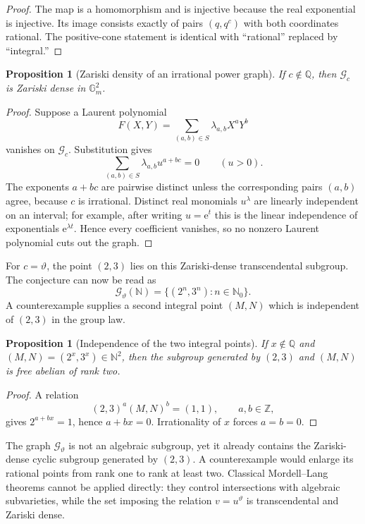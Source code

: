 \documentclass[11pt,oneside]{article}
\newtheorem{proposition}[theorem]{Proposition}
\theoremstyle{definition}
\newcommand{\Q}{\mathbb{Q}}
\newcommand{\Z}{\mathbb{Z}}
\newcommand{\N}{\mathbb{N}}
\newcommand{\Gm}{\mathbb{G}_{m}}
\newcommand{\ee}{\mathrm{e}}
\newcommand{\cG}{\mathscr{G}}
\begin{document}
\begin{proof}
The map is a homomorphism and is injective because the real exponential is injective.  Its image consists exactly of pairs $(q,q^c)$ with both coordinates rational.  The positive-cone statement is identical with ``rational'' replaced by ``integral.''
\end{proof}

\begin{proposition}[Zariski density of an irrational power graph]\label{prop:graphdense}
If $c\notin\Q$, then $\cG_c$ is Zariski dense in $\Gm^2$.
\end{proposition}

\begin{proof}
Suppose a Laurent polynomial
\[
       F(X,Y)=\sum_{(a,b)\in S}\lambda_{a,b}X^aY^b
\]
vanishes on $\cG_c$.  Substitution gives
\[
       \sum_{(a,b)\in S}\lambda_{a,b}u^{a+bc}=0
       \qquad(u>0).
\]
The exponents $a+bc$ are pairwise distinct unless the corresponding pairs $(a,b)$ agree, because $c$ is irrational.  Distinct real monomials $u^{\lambda}$ are linearly independent on an interval; for example, after writing $u=\ee^t$ this is the linear independence of exponentials $\ee^{\lambda t}$.  Hence every coefficient vanishes, so no nonzero Laurent polynomial cuts out the graph.
\end{proof}

For $c=\vartheta$, the point $(2,3)$ lies on this Zariski-dense transcendental subgroup.  The conjecture can now be read as
\[
       \cG_{\vartheta}(\N)=\{(2^n,3^n):n\in\N_0\}.
\]
A counterexample supplies a second integral point $(M,N)$ which is independent of $(2,3)$ in the group law.

\begin{proposition}[Independence of the two integral points]\label{prop:pointind}
If $x\notin\Q$ and $(M,N)=(2^x,3^x)\in\N^2$, then the subgroup generated by $(2,3)$ and $(M,N)$ is free abelian of rank two.
\end{proposition}

\begin{proof}
A relation
\[
     (2,3)^a(M,N)^b=(1,1),\qquad a,b\in\Z,
\]
gives $2^{a+bx}=1$, hence $a+bx=0$.  Irrationality of $x$ forces $a=b=0$.
\end{proof}

\begin{roadblockbox}
The graph $\cG_{\vartheta}$ is not an algebraic subgroup, yet it already contains the Zariski-dense cyclic subgroup generated by $(2,3)$.  A counterexample would enlarge its rational points from rank one to rank at least two.  Classical Mordell--Lang theorems cannot be applied directly: they control intersections with algebraic subvarieties, while the set imposing the relation $v=u^{\vartheta}$ is transcendental and Zariski dense.
\end{roadblockbox}
\end{document}
